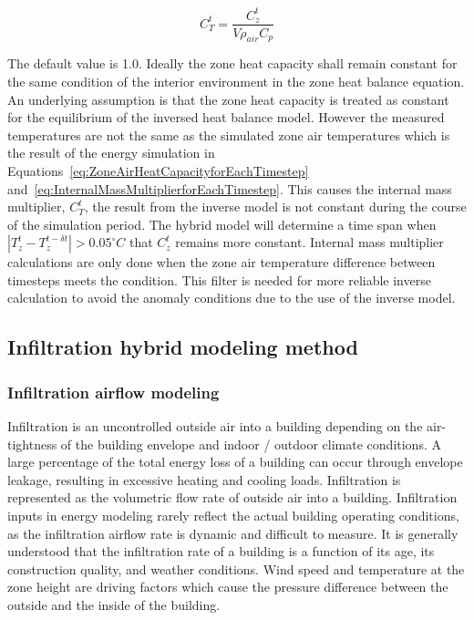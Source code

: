 \begin{equation}
C_T^t = \frac{C_z^t} {V\rho_{air} C_p}
\label{eq:InternalMassMultiplierforEachTimestep}
\end{equation}

The default value is 1.0. Ideally the zone heat capacity shall remain constant for the same condition of the interior environment in the zone heat balance equation. An underlying assumption is that the zone heat capacity is treated as constant for the equilibrium of the inversed heat balance model. However the measured temperatures are not the same as the simulated zone air temperatures which is the result of the energy simulation in Equations~\ref{eq:ZoneAirHeatCapacityforEachTimestep} and~\ref{eq:InternalMassMultiplierforEachTimestep}. This causes the internal mass multiplier, $C_T^t$, the result from the inverse model is not constant during the course of the simulation period. The hybrid model will determine a time span when $|T_z^t - T_z^{t-\delta t}| > 0.05^{\circ}C$ that $C_z^t$ remains more constant. Internal mass multiplier calculations are only done when the zone air temperature difference between timesteps meets the condition. This filter is needed for more reliable inverse calculation to avoid the anomaly conditions due to the use of the inverse model.  

\subsection{Infiltration hybrid modeling method}\label{Infiltration hybrid modeling method}

\subsubsection{Infiltration airflow modeling}\label{Infiltration airflow modeling}

Infiltration is an uncontrolled outside air into a building depending on the air-tightness of the building envelope and indoor / outdoor climate conditions. A large percentage of the total energy loss of a building can occur through envelope leakage, resulting in excessive heating and cooling loads. Infiltration is represented as the volumetric flow rate of outside air into a building. Infiltration inputs in energy modeling rarely reflect the actual building operating conditions, as the infiltration airflow rate is dynamic and difficult to measure. It is generally understood that the infiltration rate of a building is a function of its age, its construction quality, and weather conditions. Wind speed and temperature at the zone height are driving factors which cause the pressure difference between the outside and the inside of the building.

